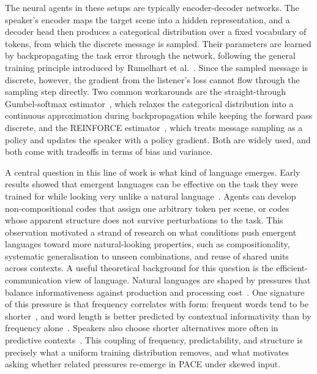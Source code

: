 The neural agents in these setups are typically encoder-decoder networks. The speaker's encoder maps the target scene into a hidden representation, and a decoder head then produces a categorical distribution over a fixed vocabulary of tokens, from which the discrete message is sampled. Their parameters are learned by backpropagating the task error through the network, following the general training principle introduced by Rumelhart et al.~\cite{rumelhart_learning_1986}. Since the sampled message is discrete, however, the gradient from the listener's loss cannot flow through the sampling step directly. Two common workarounds are the straight-through Gumbel-softmax estimator~\cite{jang_categorical_2017}, which relaxes the categorical distribution into a continuous approximation during backpropagation while keeping the forward pass discrete, and the REINFORCE estimator~\cite{williams1992simple}, which treats message sampling as a policy and updates the speaker with a policy gradient. Both are widely used, and both come with tradeoffs in terms of bias and variance.

A central question in this line of work is what kind of language emerges. Early results showed that emergent languages can be effective on the task they were trained for while looking very unlike a natural language~\cite{kottur_natural_2017,chaabouni_compositionality_2020}. Agents can develop non-compositional codes that assign one arbitrary token per scene, or codes whose apparent structure does not survive perturbations to the task. This observation motivated a strand of research on what conditions push emergent languages toward more natural-looking properties, such as compositionality, systematic generalisation to unseen combinations, and reuse of shared units across contexts.
A useful theoretical background for this question is the efficient-communication view of language. Natural languages are shaped by pressures that balance informativeness against production and processing cost~\cite{gibson_how_2019}. One signature of this pressure is that frequency correlates with form: frequent words tend to be shorter~\cite{zipf_human_1949}, and word length is better predicted by contextual informativity than by frequency alone~\cite{piantadosi_word_2011}. Speakers also choose shorter alternatives more often in predictive contexts~\cite{mahowald_infoinformation_2013}. This coupling of frequency, predictability, and structure is precisely what a uniform training distribution removes, and what motivates asking whether related pressures re-emerge in PACE under skewed input.


